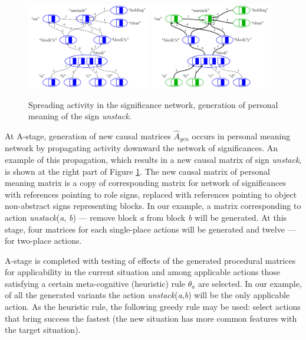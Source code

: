 \documentclass[review]{elsarticle}
\begin{document}
\begin{figure}
	\centering
	\includegraphics[width=0.48\textwidth]{plan_nets-4}
	\includegraphics[width=0.48\textwidth]{plan_nets-3}
	\caption{Spreading activity in the significance network, generation of personal meaning of the sign \textit{unstack}.}	
	\label{fig:unstack_gen}	
\end{figure}

At A-stage, generation of new causal matrices $\hat A_{gen}$ occurs in personal meaning network by propagating activity downward the network of significances. An example of this propagation, which results in a new causal matrix of sign \textit{unstack}, is shown at the right part of Figure \ref{fig:unstack_gen}. The new causal matrix of personal meaning matrix is a copy of corresponding matrix for network of significances with references pointing to role signs, replaced with references pointing to object non-abstract signs representing blocks. In our example, a matrix corresponding to action \textit{unstack}(\textit{a}, \textit{b}) --- remove block \textit{a} from block \textit{b} will be generated. At this stage, four matrices for each single-place actions will be generated and twelve --- for two-place actions.

A-stage is completed with testing of effects of the generated procedural matrices for applicability in the current situation and among applicable actions those satisfying a certain meta-cognitive (heuristic) rule $\theta_a$ are selected. In our example, of all the generated variants the action \textit{unstack}(\textit{a},\textit{b}) will be the only applicable action. As the heuristic rule, the following greedy rule may be used: select actions that bring success the fastest (the new situation has more common features with the target situation).
\end{document}
